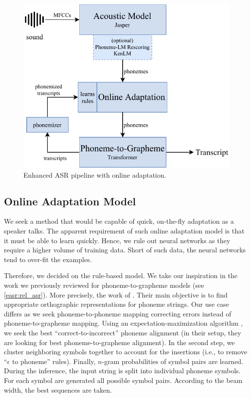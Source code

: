 \begin{figure}[t]
    \centering
    \includegraphics[width=.9\textwidth]{img/online_easr}
    \caption{Enhanced ASR pipeline with online adaptation.}
    \label{fig:online_easr}
\end{figure} 


\subsection{Online Adaptation Model}
We seek a method that would be capable of quick, on-the-fly adaptation as a speaker talks. The apparent requirement of such online adaptation model is that it must be able to learn quickly. Hence, we rule out neural networks as they require a higher volume of training data. Short of such data, the neural networks tend to over-fit the examples. 

Therefore, we decided on the rule-based model. We take our inspiration in the work we previously reviewed for phoneme-to-grapheme models (see \cref{easr:rel_asr}). More precisely, the work of . Their main objective is to find appropriate orthographic representations for phoneme strings. Our use case differs as we seek phoneme-to-phoneme mapping correcting errors instead of phoneme-to-grapheme mapping. Using an expectation-maximization algorithm , we seek the best ``correct-to-incorrect'' phoneme alignment (in their setup, they are looking for best phoneme-to-grapheme alignment). In the second step, we cluster neighboring symbols together to account for the insertions (i.e., to remove ``$\epsilon$ to phoneme'' rules). Finally, $n$-gram probabilities of symbol pairs are learned. During the inference, the input string is split into individual phoneme symbols. For each symbol are generated all possible symbol pairs. According to the beam width, the best sequences are taken. 

